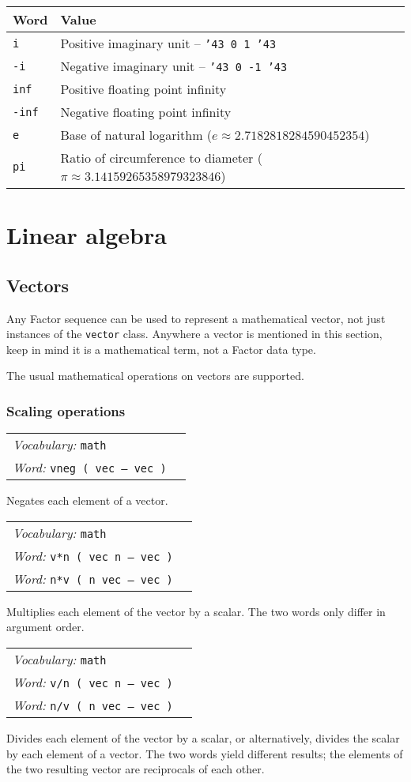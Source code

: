 \documentclass{book}
\newcommand{\tto}{\symbol{123}}
\newcommand{\ttc}{\symbol{125}}
\newcommand{\pound}{\char'43}
\newcommand{\vocabulary}[1]{\emph{Vocabulary:} \texttt{#1}&\\}
\newcommand{\ordinaryword}[2]{\index{\texttt{#1}}\emph{Word:} \texttt{#2}&\\}
\newcommand{\wordtable}[1]{


\begin{tabularx}{12cm}{lX}
\hline
#1
\hline
\end{tabularx}

}
\begin{document}
\begin{tabular}{l|l}
Word&Value\\
\hline
\texttt{i}&Positive imaginary unit -- \texttt{\pound\tto~0 1 \ttc\pound}\\
\texttt{-i}&Negative imaginary unit -- \texttt{\pound\tto~0 -1 \ttc\pound}\\
\texttt{inf}&Positive floating point infinity\\
\texttt{-inf}&Negative floating point infinity\\
\texttt{e}&Base of natural logarithm ($e\approx 2.7182818284590452354$)\\
\texttt{pi}&Ratio of circumference to diameter ($\pi\approx 3.14159265358979323846$)\\
\end{tabular}

\section{Linear algebra}

\subsection{Vectors}

Any Factor sequence can be used to represent a mathematical vector, not just instances of the \verb|vector| class. Anywhere a vector is mentioned in this section, keep in mind it is a mathematical term, not a Factor data type.

The usual mathematical operations on vectors are supported.

\subsubsection{Scaling operations}

\wordtable{
\vocabulary{math}
\ordinaryword{vneg}{vneg ( vec -- vec )}
}
Negates each element of a vector.
\wordtable{
\vocabulary{math}
\ordinaryword{v*n}{v*n ( vec n -- vec )}
\ordinaryword{n*v}{n*v ( n vec -- vec )}
}
Multiplies each element of the vector by a scalar. The two words only differ in argument order.
\wordtable{
\vocabulary{math}
\ordinaryword{v/n}{v/n ( vec n -- vec )}
\ordinaryword{n/v}{n/v ( n vec -- vec )}
}
Divides each element of the vector by a scalar, or alternatively, divides the scalar by each element of a vector. The two words yield different results; the elements of the two resulting vector are reciprocals of each other.
\end{document}

